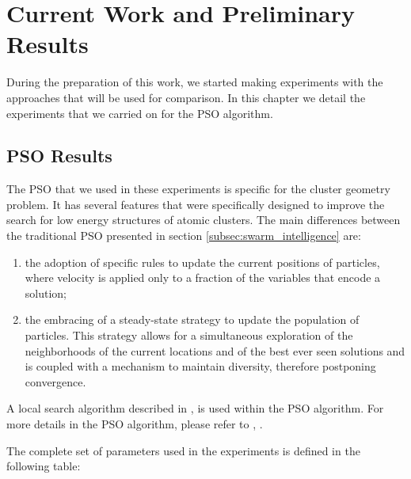 \chapter{Current Work and Preliminary Results}

\label{chap:curr_work}

		During the preparation of this work, we started making experiments with the approaches that will be used for comparison. In this chapter we detail the experiments that we carried on for the PSO algorithm.
		
	\section{PSO Results}
	The PSO that we used in these experiments is specific for the cluster geometry problem. It has several features that were specifically designed to improve the search for low energy structures of atomic clusters. The main differences between the traditional PSO presented in section \ref{subsec:swarm_intelligence} are:
	\begin{enumerate}
		\item the adoption of specific rules to update the current positions of particles, where velocity is applied only to a fraction of the variables that encode a solution; 
		\item the embracing of a steady-state strategy to update the population of particles. This strategy allows for a simultaneous exploration of the neighborhoods of the current locations and of the best ever seen solutions and is coupled with a mechanism to maintain diversity, therefore postponing convergence.
	\end{enumerate}
	A local search algorithm described in \cite{liu89}, is used within the PSO algorithm. For more details in the PSO algorithm, please refer to \cite{lourenco10}, \cite{lourenco11}.
	
	The complete set of parameters used in the experiments is defined in the following table:
	
